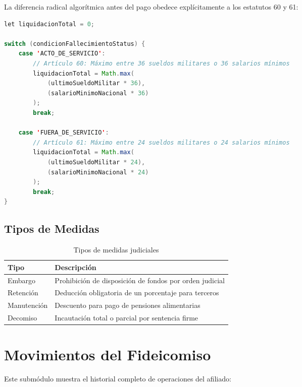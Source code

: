 La diferencia radical algorítmica antes del pago obedece explícitamente a los estatutos 60 y 61:

\begin{lstlisting}[language=Java, caption=Indemnización de Muerte (Art. 60 y 61)]
let liquidacionTotal = 0;

switch (condicionFallecimientoStatus) {
    case 'ACTO_DE_SERVICIO':
        // Artículo 60: Máximo entre 36 sueldos militares o 36 salarios mínimos
        liquidacionTotal = Math.max(
            (ultimoSueldoMilitar * 36), 
            (salarioMinimoNacional * 36)
        );
        break;

    case 'FUERA_DE_SERVICIO':
        // Artículo 61: Máximo entre 24 sueldos militares o 24 salarios mínimos
        liquidacionTotal = Math.max(
            (ultimoSueldoMilitar * 24), 
            (salarioMinimoNacional * 24)
        );
        break;
}
\end{lstlisting}

\subsection*{Tipos de Medidas}

\begin{longtable}{p{3cm}p{9cm}}
\toprule
\textbf{Tipo} & \textbf{Descripción} \\
\midrule
\endhead
\bottomrule
\caption{Tipos de medidas judiciales}
\label{tab:medidas-judiciales}
\endlastfoot

Embargo & Prohibición de disposición de fondos por orden judicial \\
Retención & Deducción obligatoria de un porcentaje para terceros \\
Manutención & Descuento para pago de pensiones alimentarias \\
Decomiso & Incautación total o parcial por sentencia firme \\
\end{longtable}

\section{Movimientos del Fideicomiso}

Este submódulo muestra el historial completo de operaciones del afiliado:

